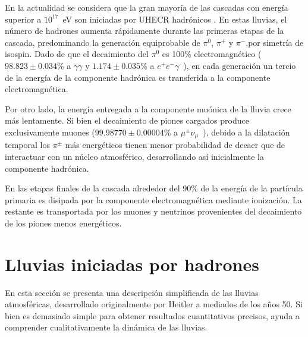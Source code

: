 En la actualidad se considera que la gran mayoría de las cascadas con energía superior a $10^{17}$~eV son iniciadas por UHECR hadrónicos \cite{cite:Auger_photon_limit}. 
En estas lluvias, el número de hadrones aumenta rápidamente durante las primeras etapas de la cascada, predominando la generaci\'on equiprobable de $\pi^{0}$, $\pi^{+}$ y $\pi^{-}$,por simetría de isospin.
Dado de que el decaimiento del $\pi^{0}$ es 100\% electromagnético ($98.823\pm0.034\%$ a $\gamma\gamma$ y $1.174\pm0.035\%$ a $e^+e^-\gamma$~\cite{Agashe:2014kda}), en cada generación un tercio de la energía de la componente hadr\'onica es transferida a la componente electromagnética.

Por otro lado, la energ\'ia entregada a la componente muónica de la lluvia crece más lentamente. 
Si bien el decaimiento de piones cargados produce exclusivamente muones ($99.98770\pm0.00004\%$ a $\mu^{\pm}\nu_\mu$~\cite{Agashe:2014kda}), debido a la dilatación temporal los $\pi^{\pm}$ más energéticos tienen menor probabilidad de decaer que de interactuar con un n\'ucleo atmosf\'erico, desarrollando así inicialmente la componente hadrónica.

En las etapas finales de la cascada alrededor del 90\% de la energía de la partícula primaria es disipada por la componente electromagnética mediante ionización. La restante es transportada por los muones y neutrinos provenientes del decaimiento de los piones menos energéticos.

\section{Lluvias iniciadas por hadrones}
En esta sección se presenta una descripción simplificada de las lluvias atmosféricas, desarrollado originalmente por Heitler \cite{hei54} a mediados de los años 50. Si bien es demasiado simple para obtener resultados cuantitativos precisos, ayuda a comprender cualitativamente la dinámica de las lluvias.

